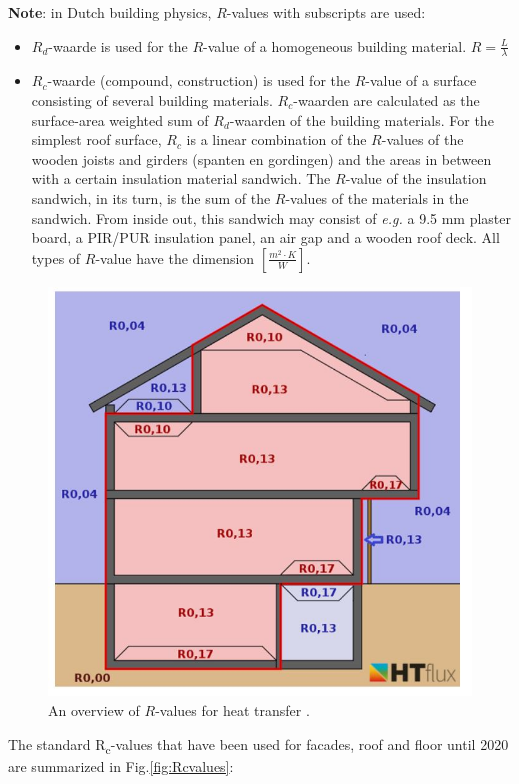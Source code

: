 \textbf{Note}: in Dutch building physics, $R$-values with subscripts are used:
\begin{itemize}
	\item $R_d$-waarde is used for the $R$-value of a homogeneous building material. $ R = \frac{L}{\lambda} $
	\item $R_c$-waarde (compound, construction) is used for the $R$-value of a surface consisting of several building materials. $R_c$-waarden are calculated as the surface-area weighted sum of $R_d$-waarden of the building materials. 
	For the simplest roof surface, $R_c$ is a linear combination of the $R$-values of the wooden joists and girders (spanten en gordingen) and the areas in between with a certain insulation material sandwich.
	The $R$-value of the insulation sandwich, in its turn, is the sum of the $R$-values of the materials in the sandwich. From inside out, this sandwich may consist of \textit{e.g.} a 9.5 mm plaster board, a PIR/PUR insulation panel, an air gap and a wooden roof deck. All types of $R$-value have the dimension $ [\frac{m^2 \cdot K}{W}] $.
\end{itemize}

\begin{figure}[H]
	\centering
	\includegraphics[width=0.8\columnwidth]{Pictures/Overview of heat resistances.JPG}
	\caption[Short title]{An overview of $R$-values for heat transfer \cite{SURFREST}.}
	\label{fig:overview}
\end{figure}


The standard R\textsubscript{c}-values that have been used for facades, roof and floor until 2020 are summarized in Fig.\ref{fig:Rcvalues}:

